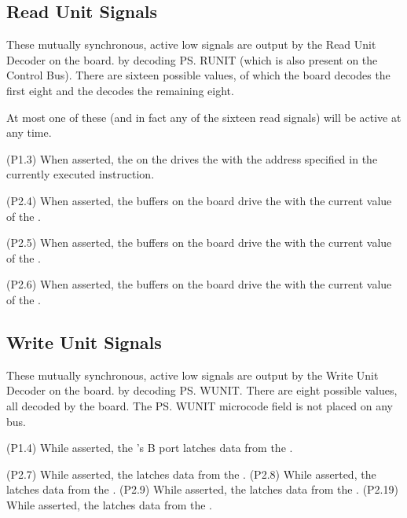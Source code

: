 \subsection{Read Unit Signals}

These mutually synchronous, active low signals are output by the Read Unit
Decoder on the  board. by decoding \ps{RUNIT} (which is also present
on the Control Bus). There are sixteen possible values, of which the
 board decodes the first eight and the \ALU{} decodes the remaining
eight.

At most one of these (and in fact any of the sixteen read signals) will be
active at any time.

\begin{description}
\li{\RAGL} (P1.3) When asserted, the \AGL{} on the  drives
the \IBUS{} with the address specified in the currently executed
instruction.

\li{\RAC} (P2.4) When asserted, the \Areg{} buffers on the  board
drive the \IBUS{} with the current value of the \Areg.

\li{\RDR} (P2.5) When asserted, the \DR{} buffers on the  board
drive the \IBUS{} with the current value of the \DR.

\li{\RPC} (P2.6) When asserted, the \PC{} buffers on the  board
drive the \IBUS{} with the current value of the \PC.

\end{description}

\subsection{Write Unit Signals}

These mutually synchronous, active low signals are output by the Write Unit
Decoder on the  board. by decoding \ps{WUNIT}. There are eight
possible values, all decoded by the  board. The \ps{WUNIT} microcode
field is not placed on any bus.

\begin{description}
\li{\WALU} (P1.4) While asserted, the \ALU{}'s B port latches data from the
\IBUS.

\li{\WAC} (P2.7) While asserted, the \AC{} latches data from the \IBUS.
\li{\WDR} (P2.8) While asserted, the \DR{} latches data from the \IBUS.
\li{\WPC} (P2.9) While asserted, the \AC{} latches data from the \IBUS.
\li{\WIR} (P2.19) While asserted, the \IR{} latches data from the \IBUS.

\end{description}


